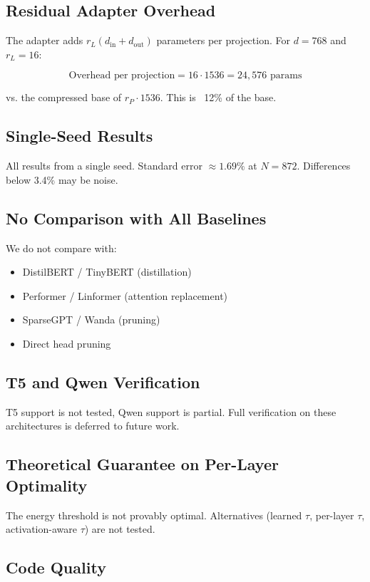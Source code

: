 \subsection{Residual Adapter Overhead}

The adapter adds $r_L (d_\text{in} + d_\text{out})$ parameters per projection. 
For $d = 768$ and $r_L = 16$:

\[
\text{Overhead per projection} = 16 \cdot 1536 = 24,576 \text{ params}
\]

vs. the compressed base of $r_P \cdot 1536$. This is ~12\% 
of the base.

\subsection{Single-Seed Results}

All results from a single seed. Standard error $\approx 1.69\%$ at $N = 872$. 
Differences below 3.4\% may be noise.

\subsection{No Comparison with All Baselines}

We do not compare with:
\begin{itemize}
\item DistilBERT / TinyBERT (distillation)
\item Performer / Linformer (attention replacement)
\item SparseGPT / Wanda (pruning)
\item Direct head pruning

\end{itemize}
\subsection{T5 and Qwen Verification}

T5 support is not tested, Qwen support is partial. Full 
verification on these architectures is deferred to future work.

\subsection{Theoretical Guarantee on Per-Layer Optimality}

The energy threshold is not provably optimal. Alternatives (learned $\tau$, 
per-layer $\tau$, activation-aware $\tau$) are not tested.

\subsection{Code Quality}

